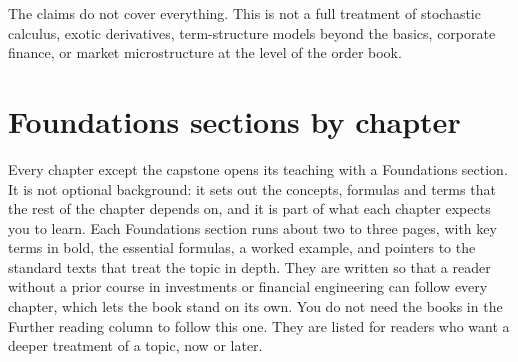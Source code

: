 The claims do not cover everything. This is not a full treatment of stochastic calculus, exotic derivatives, term-structure models beyond the basics, corporate finance, or market microstructure at the level of the order book. 

\section*{Foundations sections by chapter}

Every chapter except the capstone opens its teaching with a Foundations section. It is not optional background: it sets out the concepts, formulas and terms that the rest of the chapter depends on, and it is part of what each chapter expects you to learn. Each Foundations section runs about two to three pages, with key terms in bold, the essential formulas, a worked example, and pointers to the standard texts that treat the topic in depth. They are written so that a reader without a prior course in investments or financial engineering can follow every chapter, which lets the book stand on its own. You do not need the books in the Further reading column to follow this one. They are listed for readers who want a deeper treatment of a topic, now or later.

